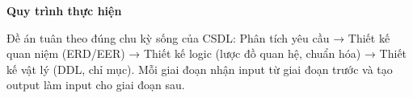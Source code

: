 \begin{infobox}
\textbf{Quy trình thực hiện}

\smallskip
Đề án tuân theo đúng chu kỳ sống của CSDL: Phân tích yêu cầu → Thiết kế quan niệm (ERD/EER) → Thiết kế logic (lược đồ quan hệ, chuẩn hóa) → Thiết kế vật lý (DDL, chỉ mục). Mỗi giai đoạn nhận input từ giai đoạn trước và tạo output làm input cho giai đoạn sau.
\end{infobox}

